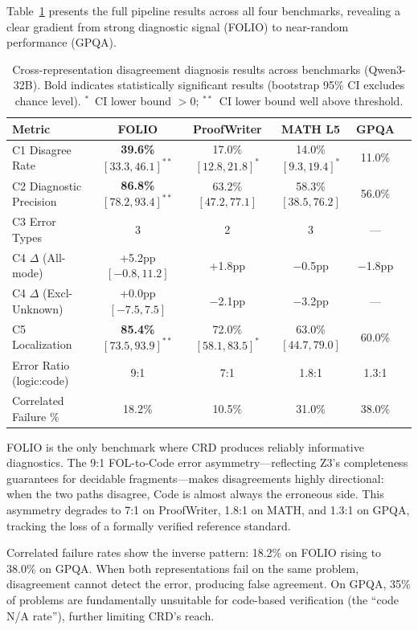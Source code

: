 \documentclass[11pt,a4paper]{article}
\newcommand{\pp}{\text{pp}}
\begin{document}
Table~\ref{tab:main} presents the full pipeline results across all four benchmarks, revealing a clear gradient from strong diagnostic signal (FOLIO) to near-random performance (GPQA).

\begin{table}[t]
\centering
\small
\caption{Cross-representation disagreement diagnosis results across benchmarks (Qwen3-32B). Bold indicates statistically significant results (bootstrap 95\% CI excludes chance level). $^*$~CI lower bound $> 0$; $^{**}$~CI lower bound well above threshold.}
\label{tab:main}
\begin{tabular}{lccccc}
\toprule
\textbf{Metric} & \textbf{FOLIO} & \textbf{ProofWriter} & \textbf{MATH L5} & \textbf{GPQA} \\
\midrule
C1 Disagree Rate & \textbf{39.6\%} $[33.3, 46.1]^{**}$ & 17.0\% $[12.8, 21.8]^{*}$ & 14.0\% $[9.3, 19.4]^{*}$ & 11.0\% \\
C2 Diagnostic Precision & \textbf{86.8\%} $[78.2, 93.4]^{**}$ & 63.2\% $[47.2, 77.1]$ & 58.3\% $[38.5, 76.2]$ & 56.0\% \\
C3 Error Types & 3 & 2 & 3 & --- \\
C4 $\Delta$ (All-mode) & +5.2$\pp$ $[-0.8, 11.2]$ & +1.8$\pp$ & $-$0.5$\pp$ & $-$1.8$\pp$ \\
C4 $\Delta$ (Excl-Unknown) & +0.0$\pp$ $[-7.5, 7.5]$ & $-$2.1$\pp$ & $-$3.2$\pp$ & --- \\
C5 Localization & \textbf{85.4\%} $[73.5, 93.9]^{**}$ & 72.0\% $[58.1, 83.5]^{*}$ & 63.0\% $[44.7, 79.0]$ & 60.0\% \\
\midrule
Error Ratio (logic:code) & 9:1 & 7:1 & 1.8:1 & 1.3:1 \\
Correlated Failure \% & 18.2\% & 10.5\% & 31.0\% & 38.0\% \\
\bottomrule
\end{tabular}
\end{table}

FOLIO is the only benchmark where CRD produces reliably informative diagnostics. The 9:1 FOL-to-Code error asymmetry---reflecting Z3's completeness guarantees for decidable fragments---makes disagreements highly directional: when the two paths disagree, Code is almost always the erroneous side. This asymmetry degrades to 7:1 on ProofWriter, 1.8:1 on MATH, and 1.3:1 on GPQA, tracking the loss of a formally verified reference standard.

Correlated failure rates show the inverse pattern: 18.2\% on FOLIO rising to 38.0\% on GPQA. When both representations fail on the same problem, disagreement cannot detect the error, producing false agreement. On GPQA, 35\% of problems are fundamentally unsuitable for code-based verification (the ``code N/A rate''), further limiting CRD's reach.
\end{document}
